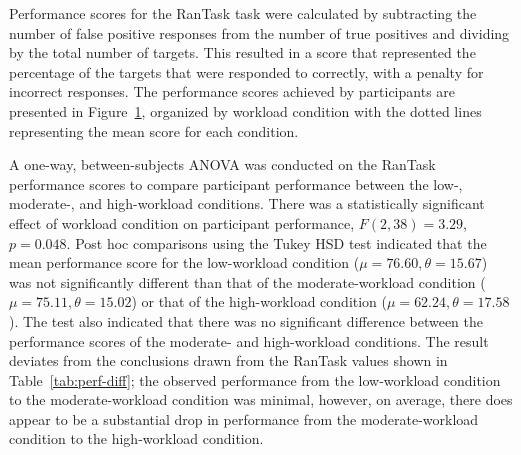 \documentclass[11pt]{article}
\begin{document}
		\begin{table}[]
		\caption[Performance Difference Between Conditions]{Mean Performance Difference Between Conditions}
		\centering
		\label{tab:perf-diff}
		\end{table}
		
		Performance scores for the RanTask task were calculated by subtracting the number of false positive responses from the number of true positives and dividing by the total number of targets. This resulted in a score that represented the percentage of the targets that were responded to correctly, with a penalty for incorrect responses. The performance scores achieved by participants are presented in Figure~\ref{fig:rantask-perf}, organized by workload condition with the dotted lines representing the mean score for each condition.
		
		\begin{figure}
		\centering
		\caption{}
		\label{fig:rantask-perf}
		\end{figure} 
		
		A one-way, between-subjects ANOVA was conducted on the RanTask performance scores to compare participant performance between the low-, moderate-, and high-workload conditions. There was a statistically significant effect of workload condition on participant performance, \(F(2, 38) = 3.29\), \(p=0.048\). Post hoc comparisons using the Tukey HSD test indicated that the mean performance score for the low-workload condition (\(\mu = 76.60, \theta = 15.67 \)) was not significantly different than that of the moderate-workload condition (\(\mu = 75.11, \theta = 15.02\)) or that of the high-workload condition (\(\mu = 62.24, \theta = 17.58\)). The test also indicated that there was no significant difference between the performance scores of the moderate- and high-workload conditions. The result deviates from the conclusions drawn from the RanTask values shown in Table~\ref{tab:perf-diff}; the observed performance from the low-workload condition to the moderate-workload condition was minimal, however, on average, there does appear to be a substantial drop in performance from the moderate-workload condition to the high-workload condition.
		
\end{document}
